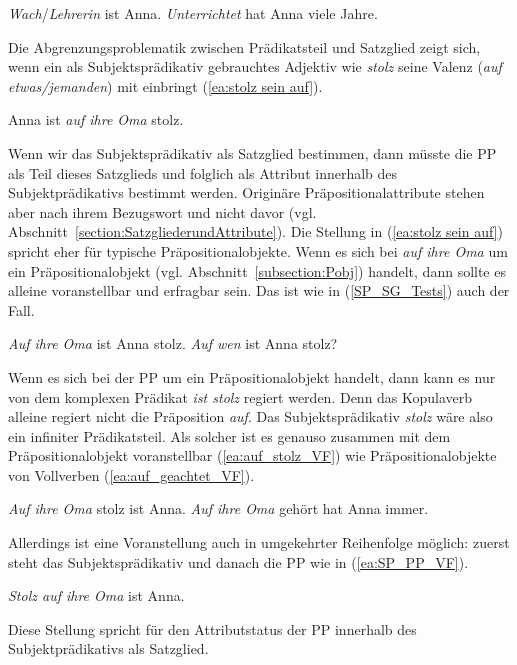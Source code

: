 \ea \label{ea:SP_Umstellung}
\ea \label{ea:SP_VF} \textit{Wach}/\textit{Lehrerin} ist Anna.
\ex \label{ex:PT_VF} \textit{Unterrichtet} hat Anna viele Jahre.
\z 
\z 

Die Abgrenzungsproblematik zwischen Prädikatsteil und Satzglied zeigt sich, wenn ein als Subjektsprädikativ gebrauchtes Adjektiv  wie \textit{stolz} seine Valenz (\textit{auf etwas/jemanden}) mit einbringt (\ref{ea:stolz sein auf}).

\ea \label{ea:stolz sein auf} Anna ist \textit{auf ihre Oma} stolz.
\z 

Wenn wir das Subjektsprädikativ als Satzglied bestimmen, dann müsste die PP als Teil dieses Satzglieds und folglich als Attribut innerhalb des Subjektprädikativs bestimmt werden. Originäre Präpositionalattribute stehen aber nach ihrem Bezugswort und nicht davor (vgl. Abschnitt~\ref{section:SatzgliederundAttribute}). Die Stellung in (\ref{ea:stolz sein auf}) spricht eher für typische Präpositionalobjekte. Wenn es sich bei \textit{auf ihre Oma} um ein Präpositionalobjekt (vgl. Abschnitt~\ref{subsection:Pobj}) handelt, dann sollte es alleine voranstellbar und erfragbar sein. Das ist wie in (\ref{SP_SG_Tests}) auch der Fall.

\ea \label{SP_SG_Tests}
\ea \label{ea:PP_VF_SP} \textit{Auf ihre Oma} ist Anna stolz.
\ex \label{ex:PP_Frage_SP} \textit{Auf wen} ist Anna stolz?
\z 
\z 

Wenn es sich bei der PP um ein Präpositionalobjekt handelt, dann kann es nur von dem komplexen Prädikat \textit{ist stolz} regiert werden. Denn das Kopulaverb alleine regiert nicht die Präposition \textit{auf}. Das Subjektsprädikativ \textit{stolz} wäre also ein infiniter Prädikatsteil. Als solcher ist es genauso zusammen mit dem Präpositionalobjekt voranstellbar (\ref{ea:auf_stolz_VF}) wie Präpositionalobjekte von Vollverben (\ref{ea:auf_geachtet_VF}).

\ea \label{ea:PP_SP_VF}
\ea \label{ea:auf_stolz_VF} \textit{Auf ihre Oma} stolz ist Anna.
\ex \label{ea:auf_geachtet_VF} \textit{Auf ihre Oma} gehört hat Anna immer.
\z 
\z 

Allerdings ist eine Voranstellung auch in umgekehrter Reihenfolge möglich: zuerst steht das Subjektsprädikativ und danach die PP wie in (\ref{ea:SP_PP_VF}).

\ea \label{ea:SP_PP_VF} \textit{Stolz auf ihre Oma} ist Anna.
\z 

Diese Stellung spricht für den Attributstatus der PP innerhalb des Subjektprädikativs als Satzglied. 

